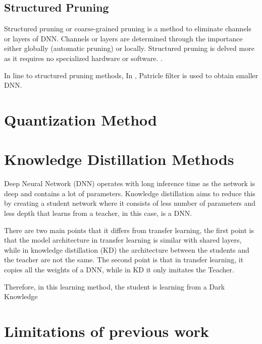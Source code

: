     \subsection{Structured Pruning}
    Structured pruning or coarse-grained pruning is a method to eliminate channels or layers of DNN. Channels or layers are determined through the importance either globally (automatic pruning) or locally. Structured pruning is delved more as it requires no specialized hardware or software. \cite{NIPS2016_6504}. 
    
    In line to structured pruning methods, In \cite{Anwar:2017:SPD:3051701.3005348}, Patricle filter is used to obtain smaller DNN. 
    
    \section{Quantization Method}
    \section{Knowledge Distillation Methods}
    Deep Neural Network (DNN) operates with long inference time as the network is deep and contains a lot of parameters. Knowledge distillation \cite{Hinton2015DistillingTK} aims to reduce this by creating a student network where it consists of less number of parameters and less depth that learns from a teacher, in this case, is a DNN.
    
    There are two main points that it differs from transfer learning, the first point is that the model architecture in transfer learning is similar with shared layers, while in knowledge distillation (KD) the architecture between the students and the teacher are not the same. The second point is that in transfer learning, it copies all the weights of a DNN, while in KD it only imitates the Teacher.
    
    Therefore, in this learning method, the student is learning from a Dark Knowledge 
    \section{Limitations of previous work}

